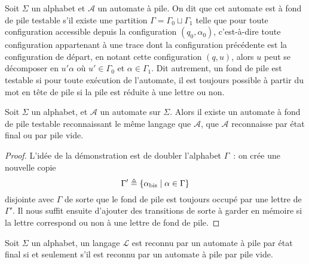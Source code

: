 \begin{definition}
    Soit $\Sigma$ un alphabet et $\mathcal A$ un automate à pile. On dit que cet
    automate est à fond de pile testable s'il existe une partition
    $\Gamma = \Gamma_0 \sqcup \Gamma_1$ telle que pour toute configuration
    accessible depuis la configuration $(q_0,\alpha_0)$, c'est-à-dire toute
    configuration appartenant à une trace dont la configuration précédente est
    la configuration de départ, en notant cette configuration $(q,u)$, alors
    $u$ peut se décomposer en $u'\alpha$ où $u' \in \Gamma_0$ et
    $\alpha \in \Gamma_1$. Dit autrement, un fond de pile est testable si pour
    toute exécution de l'automate, il est toujours possible à partir du mot en
    tête de pile si la pile est réduite à une lettre ou non.
\end{definition}

\begin{proposition}
    Soit $\Sigma$ un alphabet, et $\mathcal A$ un automate sur $\Sigma$. Alors
    il existe un automate à fond de pile testable reconnaissant le même langage que
    $\mathcal A$, que $\mathcal A$ reconnaisse par état final ou par pile vide.
\end{proposition}

\begin{proof}
    L'idée de la démonstration est de doubler l'alphabet $\Gamma$~: on crée une
    nouvelle copie
    \[\Gamma' \triangleq \{ \alpha_{\mathrm{bis}}\mid \alpha \in \Gamma\}\]
    disjointe avec $\Gamma$ de sorte que le fond de pile est toujours occupé par
    une lettre de $\Gamma'$. Il nous suffit ensuite d'ajouter des transitions de
    sorte à garder en mémoire si la lettre correspond ou non à une lettre de fond
    de pile.
\end{proof}

\begin{theorem}
    Soit $\Sigma$ un alphabet, un langage $\mathcal L$ est reconnu par un automate
    à pile par état final si et seulement s'il est reconnu par un automate à pile par
    pile vide.
\end{theorem}


